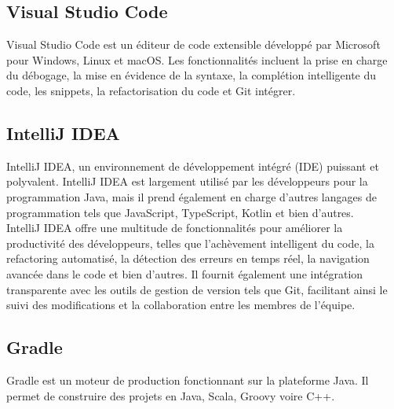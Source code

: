 \subsection*{Visual Studio Code}
Visual Studio Code est un éditeur de code extensible développé par Microsoft pour
Windows, Linux et macOS. Les fonctionnalités incluent la prise en charge du débogage,
la mise en évidence de la syntaxe, la complétion intelligente du code, les snippets, la
refactorisation du code et Git intégrer.

\subsection*{IntelliJ IDEA}
IntelliJ IDEA, un environnement de développement intégré (IDE) puissant et polyvalent. IntelliJ IDEA est largement utilisé par les développeurs pour la programmation Java, mais il prend également en charge d'autres langages de programmation tels que JavaScript, TypeScript, Kotlin et bien d'autres.\\

IntelliJ IDEA offre une multitude de fonctionnalités pour améliorer la productivité des développeurs, telles que l'achèvement intelligent du code, la refactoring automatisé, la détection des erreurs en temps réel, la navigation avancée dans le code et bien d'autres. Il fournit également une intégration transparente avec les outils de gestion de version tels que Git, facilitant ainsi le suivi des modifications et la collaboration entre les membres de l'équipe.

\subsection*{Gradle}
\par Gradle est un moteur de production fonctionnant sur la plateforme Java. Il permet de construire des projets en Java, Scala, Groovy voire C++.


